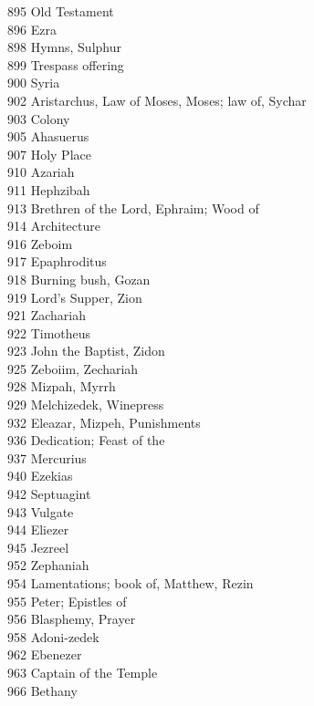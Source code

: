 895 \quad Old Testament\\
896 \quad Ezra\\
898 \quad Hymns, Sulphur\\
899 \quad Trespass offering\\
900 \quad Syria\\
902 \quad Aristarchus, Law of Moses, Moses; law of, Sychar\\
903 \quad Colony\\
905 \quad Ahasuerus\\
907 \quad Holy Place\\
910 \quad Azariah\\
911 \quad Hephzibah\\
913 \quad Brethren of the Lord, Ephraim; Wood of\\
914 \quad Architecture\\
916 \quad Zeboim\\
917 \quad Epaphroditus\\
918 \quad Burning bush, Gozan\\
919 \quad Lord’s Supper, Zion\\
921 \quad Zachariah\\
922 \quad Timotheus\\
923 \quad John the Baptist, Zidon\\
925 \quad Zeboiim, Zechariah\\
928 \quad Mizpah, Myrrh\\
929 \quad Melchizedek, Winepress\\
932 \quad Eleazar, Mizpeh, Punishments\\
936 \quad Dedication; Feast of the\\
937 \quad Mercurius\\
940 \quad Ezekias\\
942 \quad Septuagint\\
943 \quad Vulgate\\
944 \quad Eliezer\\
945 \quad Jezreel\\
952 \quad Zephaniah\\
954 \quad Lamentations; book of, Matthew, Rezin\\
955 \quad Peter; Epistles of\\
956 \quad Blasphemy, Prayer\\
958 \quad Adoni-zedek\\
962 \quad Ebenezer\\
963 \quad Captain of the Temple\\
966 \quad Bethany\\
